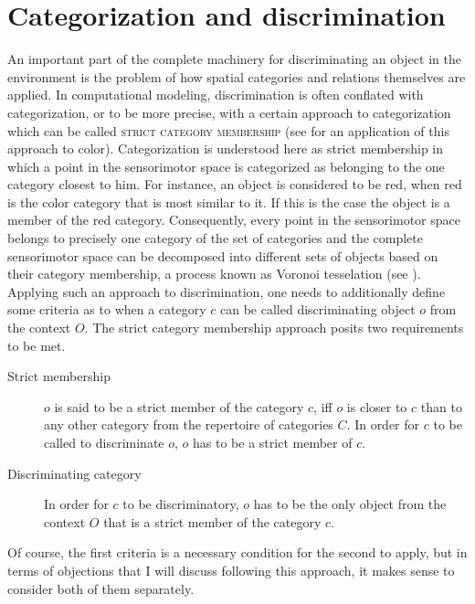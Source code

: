 \section{Categorization and discrimination}
\label{s:categorization+discrimination}
An important part of the complete machinery for discriminating an object
in the environment is the problem of how spatial categories and relations
themselves are applied. In computational modeling, discrimination is often conflated with categorization,
or to be more precise, with a certain approach to categorization which can 
be called \textsc{strict category membership} (see \citealp{belpaeme2007language} 
for an application of this approach to color). Categorization is understood here
as strict membership in which a point in the sensorimotor 
space is categorized as belonging
to the one category closest to him. For instance, an 
object is considered to be red, when red is the color category 
that is most similar to it. If this is the case the object is a member
of the red category. Consequently, every point in the sensorimotor space 
belongs to precisely one category of the set of categories and the
complete sensorimotor space can be decomposed 
into different sets of objects based on their category membership, 
a process known as Voronoi tesselation \citep{aurenhammer1991voronoi} 
(see ). Applying such an approach to discrimination, one needs to additionally 
define some criteria as to when a category $c$ can be called discriminating
object $o$ from the context $O$. The strict category membership approach
posits two requirements to be met.
\begin{description}
\item[Strict membership] $o$ is said to be a strict member of the category $c$, iff
 $o$ is closer to $c$ than to any other category from the repertoire of categories $C$.
 In order for $c$ to be called to discriminate $o$, $o$ has to be a strict member of $c$.
\item[Discriminating category] In order for $c$ to be discriminatory,
$o$ has to be the only object from the context $O$ that is a strict member of the category
$c$.
\end{description}
Of course, the first criteria is a necessary condition for the second to apply,
but in terms of objections that I will discuss following this approach, 
it makes sense to consider both of them separately. 


